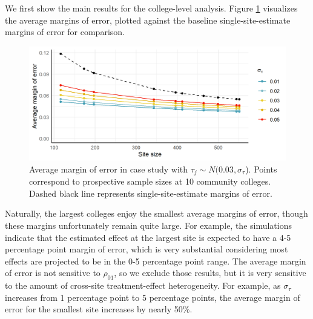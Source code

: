 \documentclass[]{article}
\begin{document}
We first show the main results for the college-level analysis.
Figure \ref{fig:case_study_moe} visualizes the average margins of error, plotted against the baseline single-site-estimate margins of error for comparison.
\begin{figure}[t]
    \centering
    \includegraphics[width=\textwidth]{writeup/images/case_study_moe.png}
    \caption{Average margin of error in case study with $\tau_j \sim N(0.03, \sigma_\tau$). Points correspond to prospective sample sizes at 10 community colleges. Dashed black line represents single-site-estimate margins of error.}
    \label{fig:case_study_moe}
\end{figure}
Naturally, the largest colleges enjoy the smallest average margins of error, though these margins unfortunately remain quite large.
For example, the simulations indicate that the estimated effect at the largest site is expected to have a 4-5 percentage point margin of error, which is very substantial considering most effects are projected to be in the 0-5 percentage point range.
The average margin of error is not sensitive to $\rho_{01}$, so we exclude those results, but it is very sensitive to the amount of cross-site treatment-effect heterogeneity.
For example, as $\sigma_\tau$ increases from 1 percentage point to 5 percentage points, the average margin of error for the smallest site increases by nearly 50\%.
\end{document}
